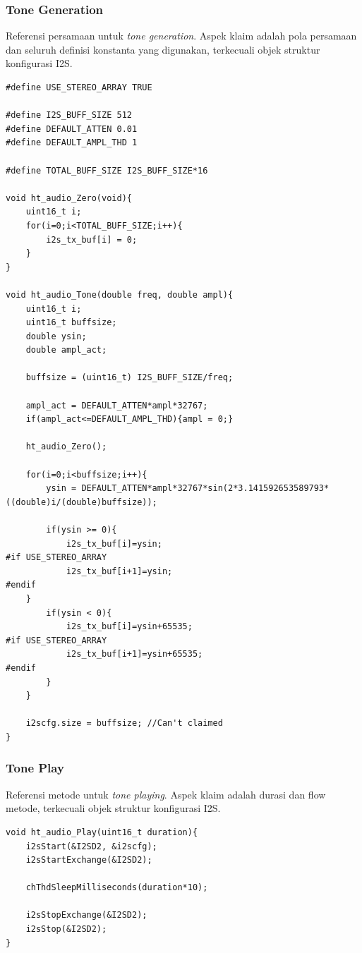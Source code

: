 \documentclass[12pt,]{article}
\begin{document}
	\subsubsection{Tone Generation}
	
	Referensi persamaan untuk \textit{tone generation}.
	Aspek klaim adalah pola persamaan dan seluruh definisi konstanta yang digunakan,
	terkecuali objek struktur konfigurasi I2S.
	
	\begin{verbatim}
#define USE_STEREO_ARRAY TRUE

#define I2S_BUFF_SIZE 512
#define DEFAULT_ATTEN 0.01
#define DEFAULT_AMPL_THD 1

#define TOTAL_BUFF_SIZE I2S_BUFF_SIZE*16

void ht_audio_Zero(void){
	uint16_t i;
	for(i=0;i<TOTAL_BUFF_SIZE;i++){
		i2s_tx_buf[i] = 0;
	}
}

void ht_audio_Tone(double freq, double ampl){
	uint16_t i;
	uint16_t buffsize;
	double ysin;
	double ampl_act;
	
	buffsize = (uint16_t) I2S_BUFF_SIZE/freq;
	
	ampl_act = DEFAULT_ATTEN*ampl*32767;
	if(ampl_act<=DEFAULT_AMPL_THD){ampl = 0;}
	
	ht_audio_Zero();
	
	for(i=0;i<buffsize;i++){
		ysin = DEFAULT_ATTEN*ampl*32767*sin(2*3.141592653589793*((double)i/(double)buffsize));
	
		if(ysin >= 0){
			i2s_tx_buf[i]=ysin;
#if USE_STEREO_ARRAY
			i2s_tx_buf[i+1]=ysin;
#endif
	}
		if(ysin < 0){
			i2s_tx_buf[i]=ysin+65535;
#if USE_STEREO_ARRAY
			i2s_tx_buf[i+1]=ysin+65535;
#endif
		}
	}
	
	i2scfg.size = buffsize; //Can't claimed
}
	\end{verbatim}

	\subsubsection{Tone Play}
	
	Referensi metode untuk \textit{tone playing}.
	Aspek klaim adalah durasi dan flow metode, terkecuali objek struktur konfigurasi I2S.

\begin{verbatim}
void ht_audio_Play(uint16_t duration){
	i2sStart(&I2SD2, &i2scfg);
	i2sStartExchange(&I2SD2);
	
	chThdSleepMilliseconds(duration*10);
	
	i2sStopExchange(&I2SD2);
	i2sStop(&I2SD2);
}
\end{verbatim}
\end{document}
